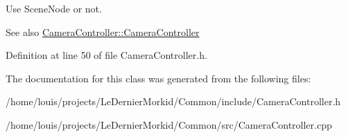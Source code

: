 Use Scene\+Node or not. 

\begin{DoxySeeAlso}{See also}
\hyperlink{class_common_1_1_camera_controller_a09c9f866ac2161de31ff45694dd711fd}{Camera\+Controller\+::\+Camera\+Controller} 
\end{DoxySeeAlso}


Definition at line 50 of file Camera\+Controller.\+h.



The documentation for this class was generated from the following files\+:\begin{DoxyCompactItemize}
\item 
/home/louis/projects/\+Le\+Dernier\+Morkid/\+Common/include/Camera\+Controller.\+h\item 
/home/louis/projects/\+Le\+Dernier\+Morkid/\+Common/src/Camera\+Controller.\+cpp\end{DoxyCompactItemize}
